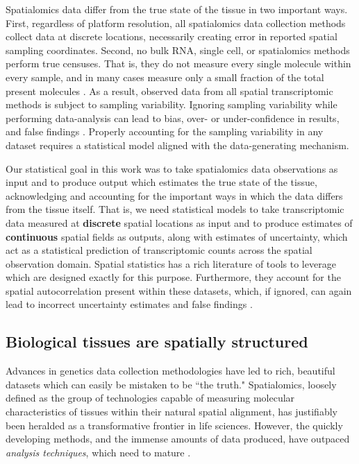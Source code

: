 \documentclass[10pt,letterpaper]{article}
\begin{document}
Spatialomics data differ from the true state of the tissue in two important ways. First, regardless of platform resolution, all spatialomics data collection methods collect data at discrete locations, necessarily creating error in reported spatial sampling coordinates. Second, no bulk RNA, single cell, or spatialomics methods perform true censuses. That is, they do not measure every single molecule within every sample, and in many cases measure only a small fraction of the total present molecules \cite{Yue2023,Wang2023}. As a result, observed data from all spatial transcriptomic methods is subject to sampling variability. Ignoring sampling variability while performing data-analysis can lead to bias, over- or under-confidence in results, and false findings \cite{li2019a}. Properly accounting for the sampling variability in any dataset requires a statistical model aligned with the data-generating mechanism.

Our statistical goal in this work was to take spatialomics data observations as input and to produce output which estimates the true state of the tissue, acknowledging and accounting for the important ways in which the data differs from the tissue itself. That is, we need statistical models to take transcriptomic data measured at \textbf{discrete} spatial locations as input and to produce estimates of \textbf{continuous} spatial fields as outputs, along with estimates of uncertainty, which act as a statistical prediction of transcriptomic counts across the spatial observation domain. Spatial statistics has a rich literature of tools to leverage which are designed exactly for this purpose. Furthermore, they account for the spatial autocorrelation present within these datasets, which, if ignored, can again lead to incorrect uncertainty estimates and false findings \cite{cannon2001}.

\subsection*{Biological tissues are spatially structured}

Advances in genetics data collection methodologies have led to rich, beautiful datasets which can easily be mistaken to be ``the truth."  Spatialomics, loosely defined as the group of technologies capable of measuring molecular characteristics of tissues within their natural spatial alignment, has justifiably been heralded as a transformative frontier in life sciences. However, the quickly developing methods, and the immense amounts of data produced, have outpaced \textit{analysis techniques}, which need to mature \cite{bressan2023}.
\end{document}
